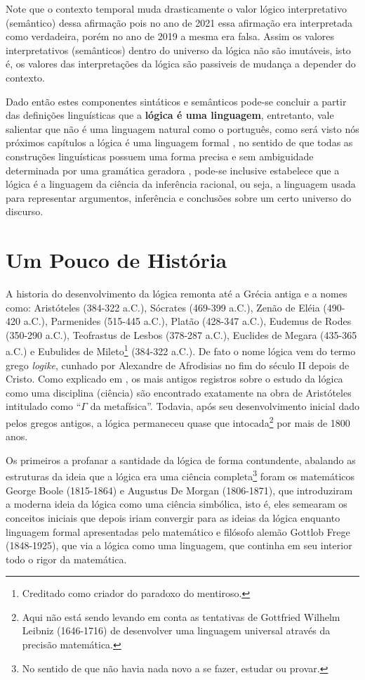 Note que o contexto temporal muda drasticamente o valor lógico interpretativo (semântico) dessa afirmação pois no ano de 2021 essa afirmação era interpretada como verdadeira, porém no ano de 2019 a mesma era falsa. Assim os valores interpretativos (semânticos) dentro do universo da lógica não são imutáveis, isto é, os valores das interpretações da lógica são passiveis de mudança a depender do contexto.

Dado então estes componentes sintáticos e semânticos pode-se concluir a partir das definições linguísticas que a \textbf{lógica é uma linguagem}, entretanto, vale salientar que não é uma linguagem natural como o português, como será visto nós próximos capítulos a lógica é uma linguagem formal \cite{benjaLivro2010}, no sentido de que todas as construções linguísticas possuem uma forma precisa e sem ambiguidade determinada por uma gramática geradora \cite{hopcroft2008, linz2006},  pode-se inclusive estabelece que a lógica é a linguagem da ciência da inferência racional, ou seja, a linguagem usada para representar argumentos, inferência e conclusões sobre um certo universo do discurso.

\section{Um Pouco de História}\label{sec:Um-pouco-historia}

A historia do desenvolvimento da lógica remonta até a Grécia antiga e a nomes como: Aristóteles (384-322 a.C.), Sócrates (469-399 a.C.), Zenão de Eléia (490-420 a.C.), Parmenides (515-445 a.C.), Platão (428-347 a.C.), Eudemus de Rodes (350-290 a.C.), Teofrastus de Lesbos (378-287 a.C.), Euclides de Megara (435-365 a.C.) e  Eubulides de Mileto\footnote{Creditado como criador do paradoxo do mentiroso.} (384-322 a.C.). De fato o nome lógica vem do termo grego \textit{logike}, cunhado por Alexandre de Afrodisias no fim do século II depois de Cristo. Como explicado em \cite{abe2002-logica}, os mais antigos registros sobre o estudo da lógica como uma disciplina (ciência) são encontrado exatamente na obra de Aristóteles intitulado como ``$\Gamma$ da metafísica''. Todavia, após seu desenvolvimento inicial dado pelos gregos antigos, a lógica permaneceu quase que intocada\footnote{Aqui não está sendo levando em conta as tentativas de Gottfried Wilhelm Leibniz (1646-1716) de desenvolver uma linguagem universal através da precisão matemática.} por mais de 1800 anos.

Os primeiros a profanar a santidade da lógica de forma contundente, abalando as estruturas da ideia que a lógica era uma ciência completa\footnote{No sentido de que não havia nada novo a se fazer, estudar ou provar.} foram os matemáticos George Boole (1815-1864) e Augustus De Morgan (1806-1871), que introduziram a moderna ideia da lógica como uma ciência simbólica, isto é, eles semearam os conceitos iniciais que depois iriam convergir para as ideias da lógica enquanto linguagem formal apresentadas pelo matemático e filósofo alemão Gottlob Frege (1848-1925), que via a lógica como uma linguagem, que continha em seu interior todo o rigor da matemática.

